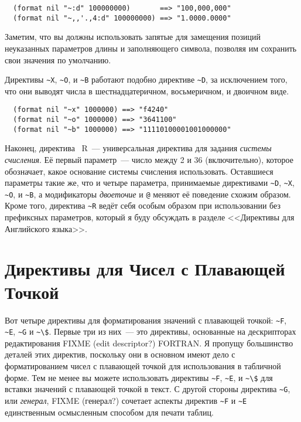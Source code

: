 \begin{verbatim}
  (format nil "~:d" 100000000)       ==> "100,000,000"
  (format nil "~,,'.,4:d" 100000000) ==> "1.0000.0000"
\end{verbatim}

Заметим, что вы должны использовать запятые для замещения позиций неуказанных параметров
длины и заполняющего символа, позволяя им сохранить свои значения по умолчанию.

Директивы \lstinline!~X!, \lstinline!~O!, и \lstinline!~B! работают подобно директиве
\lstinline!~D!, за исключением того, что они выводят числа в шестнадцатеричном,
восьмеричном, и двоичном виде.

\begin{verbatim}
  (format nil "~x" 1000000) ==> "f4240"
  (format nil "~o" 1000000) ==> "3641100"
  (format nil "~b" 1000000) ==> "11110100001001000000"
\end{verbatim}

Наконец, директива ~R~--- универсальная директива для задания \textit{системы счисления}. Её
первый параметр~--- число между 2 и 36 (включительно), которое обозначает, какое основание
системы счисления использовать. Оставшиеся параметры такие же, что и четыре параметра,
принимаемые директивами \lstinline!~D!, \lstinline!~X!, \lstinline!~O!, и \lstinline!~B!,
а модификаторы \textit{двоеточие} и \lstinline!@! меняют её поведение схожим
образом. Кроме того, директива \lstinline!~R! ведёт себя особым образом при использовании
без префиксных параметров, который я буду обсуждать в разделе <<Директивы для Английского
языка>>.

\section{Директивы для Чисел с Плавающей Точкой}

Вот четыре директивы для форматирования значений с плавающей точкой: \lstinline!~F!,
\lstinline!~E!, \lstinline!~G! и \lstinline!~\$!. Первые три из них~--- это директивы,
основанные на дескрипторах редактирования FIXME (edit descriptor?) FORTRAN. Я пропущу
большинство деталей этих директив, поскольку они в основном имеют дело с форматированием
чисел с плавающей точкой для использования в табличной форме. Тем не менее вы можете
использовать директивы \lstinline!~F!, \lstinline!~E!, и \lstinline!~\$! для вставки
значений с плавающей точкой в текст.  С другой стороны директива \lstinline!~G!, или
\textit{генерал}, FIXME (генерал?)  сочетает аспекты директив \lstinline!~F! и
\lstinline!~E! единственным осмысленным способом для печати таблиц.

